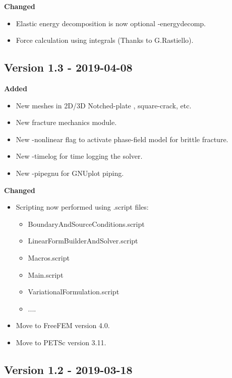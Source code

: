 \textbf{Changed}
\begin{itemize}
 \item Elastic energy decomposition is now optional {\ttfamily -energydecomp}.
 \item Force calculation using integrals (Thanks to G.Rastiello).
\end{itemize}

\subsection{Version 1.3 - 2019-04-08}

\textbf{Added}
\begin{itemize}
 \item New meshes in 2D/3D {\ttfamily Notched-plate} , {\ttfamily square-crack}, etc.
 \item New fracture mechanics module.
 \item New {\ttfamily -nonlinear} flag to activate phase-field model for brittle fracture.
 \item New {\ttfamily -timelog} for time logging the solver.
 \item New {\ttfamily -pipegnu} for GNUplot piping.
\end{itemize}

\textbf{Changed}
\begin{itemize}
 \item Scripting now performed using {\ttfamily .script} files:
 \begin{itemize}
	\item {\ttfamily BoundaryAndSourceConditions.script}
	\item {\ttfamily LinearFormBuilderAndSolver.script}
	\item {\ttfamily Macros.script} 
	\item {\ttfamily Main.script} 
	\item {\ttfamily VariationalFormulation.script} 
	\item ....
	\end{itemize}
\item Move to FreeFEM version 4.0.
\item Move to PETSc version 3.11.
\end{itemize}

\subsection{Version 1.2 - 2019-03-18}


